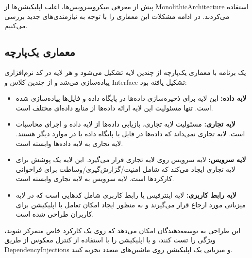 پیش از معرفی میکروسرویس‌ها، اغلب اپلیکیشن‌ها از
\gls{MonolithicArchitecture}
استفاده می‌کردند. در ادامه مشکلات این معماری را با توجه به نیازمندی‌های جدید بررسی می‌کنیم.

\subsection{معماری یک‌پارچه}
یک برنامه با معماری یک‌پارچه از چندین لایه تشکیل می‌شود و هر لایه در کد نرم‌افزاری پیاده‌سازی می‌شد و از چندین کلاس و
\gls{Interface}
تشکیل یافته بود:

\begin{itemize}

\item
\textbf{
لایه داده:
}
این لایه برای ذخیره‌سازی داده‌ها در پایگاه داده و فایل‌ها پیاده‌سازی شده است. تنها مسئولیت این لایه ارائه داده‌ها از منابع داده‌ای مختلف است.

\item
\textbf{
لایه تجاری:
}
مسئولیت لایه تجاری، بازیابی داده‌ها از لایه داده و اجرای محاسبات است. لایه تجاری نمی‌داند که داده‌ها در فایل یا پایگاه داده یا در موارد دیگر هستند. لایه تجاری به لایه داده‌ها وابسته است.

\item
\textbf{
لایه سرویس:
}
لایه سرویس روی لایه تجاری قرار می‌گیرد. این لایه یک پوشش برای لایه تجاری ایجاد می‌کند که شامل امنیت/گزارش‌گیری/وساطت برای فراخوانی کارکردها است. لایه سرویس به لایه تجاری وابسته است.

\item
\textbf{
لایه رابط کاربری:
}
لایه اینترفیس یا رابط کاربری شامل کدهایی است که در لایه میزبانی مورد ارجاع قرار می‌گیرند و به منظور ایجاد امکان تعامل با اپلیکیشن برای کاربران طراحی شده است.

\end{itemize}

این طراحی به توسعه‌دهندگان امکان می‌دهد که روی یک کارکرد خاص متمرکز شوند، ویژگی را تست کنند، و یا اپلیکیشن را با استفاده از کنترل معکوس از طریق
\glspl{DependencyInjection}
و میزبانی یک اپلیکیشن روی ماشین‌های متعدد تجزیه کنند.
\cite{fowler_patterns_2003}

